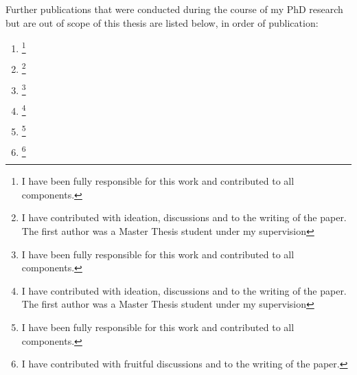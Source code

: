 \noindent
Further publications that were conducted during the course of my PhD research but are out of scope of this thesis are listed below, in order of publication:
\begin{enumerate}
    \item \begin{refsection}\end{refsection}
    \footnote{I have been fully responsible for this work and contributed to all components.}

    \item \begin{refsection}\end{refsection}
    \footnote{I have contributed with ideation, discussions and to the writing of the paper. The first author was a Master Thesis student under my supervision}

    \item \begin{refsection}\end{refsection}
    \footnote{I have been fully responsible for this work and contributed to all components.}

    \item \begin{refsection}\end{refsection}
    \footnote{I have contributed with ideation, discussions and to the writing of the paper. The first author was a Master Thesis student under my supervision}

    \item \begin{refsection}\end{refsection}
    \footnote{I have been fully responsible for this work and contributed to all components.}

    \item \begin{refsection} \end{refsection}
    \footnote{I have contributed with fruitful discussions and to the writing of the paper.}

\end{enumerate}

